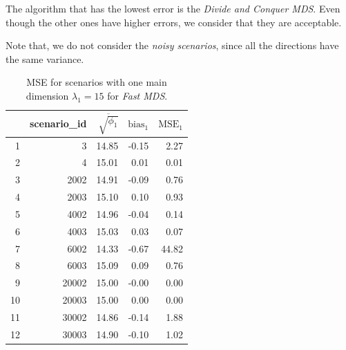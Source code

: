 \documentclass[11pt]{report}
\begin{document}
\indent The algorithm that has the lowest error is the 
\textit{Divide and Conquer MDS}. Even though the other ones have higher errors,
we consider that they are acceptable.

\indent Note that, we do not consider the \textit{noisy scenarios}, since all 
the directions have the same variance.


\begin{table}[ht]
\centering
\begin{tabular}{rrrrr}
 & scenario\_id & $\overline{\sqrt{\phi_1}}$ & $\mbox{bias}_1$ & $\mbox{MSE}_1$ \\
  \hline
  1 & 3 & 14.85 & -0.15 & 2.27 \\ 
  2 & 4 & 15.01 & 0.01 & 0.01 \\ 
  3 & 2002 & 14.91 & -0.09 & 0.76 \\ 
  4 & 2003 & 15.10 & 0.10 & 0.93 \\ 
  5 & 4002 & 14.96 & -0.04 & 0.14 \\ 
  6 & 4003 & 15.03 & 0.03 & 0.07 \\ 
  7 & 6002 & 14.33 & -0.67 & 44.82 \\ 
  8 & 6003 & 15.09 & 0.09 & 0.76 \\ 
  9 & 20002 & 15.00 & -0.00 & 0.00 \\ 
  10 & 20003 & 15.00 & 0.00 & 0.00 \\ 
  11 & 30002 & 14.86 & -0.14 & 1.88 \\ 
  12 & 30003 & 14.90 & -0.10 & 1.02 \\ 
   \hline
\end{tabular}
\caption{MSE for scenarios with one main dimension $\lambda_1 = 15$ for \textit{Fast MDS}.}
\label{mse_fast_one_dimensions}
\end{table}
\end{document}
